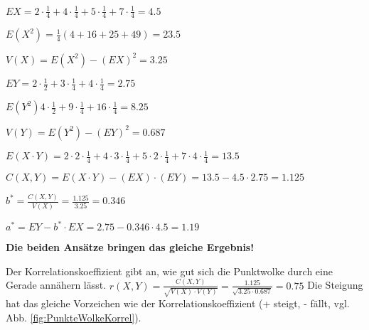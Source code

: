 $
EX = 
2\cdot \frac{1}{4} 
+4\cdot \frac{1}{4} 
+5\cdot \frac{1}{4} 
+7\cdot \frac{1}{4} 
=4.5
$

$
E(X^2) =
\frac{1}{4} (
4+16+25+49
)
= 23.5
$

$V(X) = E(X^2) - (EX)^2 = 3.25$

$EY = 
2\cdot \frac{1}{2} 
+3\cdot \frac{1}{4} 
+4\cdot \frac{1}{4} 
=2.75$

$E(Y^2)
4\cdot \frac{1}{2} 
+9\cdot \frac{1}{4} 
+16\cdot \frac{1}{4} 
=8.25
$

$V(Y) = E(Y^2) - (EY)^2 = 0.687$

$E(X\cdot Y) = 
2\cdot 2\cdot \frac{1}{4} 
+4\cdot 3\cdot \frac{1}{4} 
+5\cdot 2\cdot \frac{1}{4} 
+7\cdot 4\cdot \frac{1}{4} 
= 13.5$

$C(X,Y) = 
E(X\cdot Y) - (EX) \cdot (EY) = 13.5 - 4.5 \cdot 2.75 = 1.125$

$b^* = \frac{C(X,Y) }{V(X)} = \frac{1.125}{3.25} = 0.346$

$a^* = EY - b^* \cdot EX = 2.75 - 0.346 \cdot 4.5 = 1.19$

\textbf{Die beiden Ansätze bringen das gleiche Ergebnis!}\\

Der Korrelationskoeffizient gibt an, wie gut sich die Punktwolke durch eine Gerade annähern lässt. 
$r(X,Y) = \frac{C(X,Y)}{\sqrt{V(X)\cdot V(Y)}} = \frac{1.125}{\sqrt{3.25 \cdot 0.687}} = 0.75$ 
Die Steigung hat das gleiche Vorzeichen wie der Korrelationskoeffizient (+ steigt, - fällt, vgl. Abb. \ref{fig:PunkteWolkeKorrel}). 